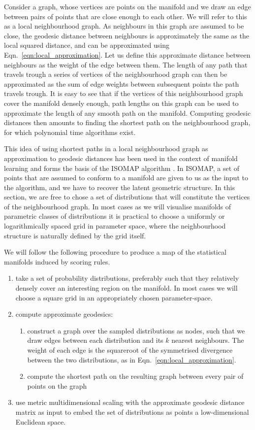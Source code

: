 Consider a graph, whose vertices are points on the manifold and we draw an edge between pairs of points that are close enough to each other. We will refer to this as a local neighbourhood graph. As neighbours in this graph are assumed to be close, the geodesic distance between neighbours is approximately the same as the local squared distance, and can be approximated using Eqn.\ \ref{eqn:local_approximation}. Let us define this approximate distance between neighbours as the weight of the edge between them. The length of any path that travels trough a series of vertices of the neighbourhood graph can then be approximated as the sum of edge weights between subsequent points the path travels trough. It is easy to see that if the vertices of this neighbourhood graph cover the manifold densely enough, path lengths on this graph can be used to approximate the length of any smooth path on the manifold. Computing geodesic distances then amounts to finding the shortest path on the neighbourhood graph, for which polynomial time algorithms exist.

This idea of using shortest paths in a local neighbourhood graph as approximation to geodesic distances has been used in the context of manifold learning and forms the basis of the ISOMAP algorithm \citep{isomap}. In ISOMAP, a set of points that are assumed to conform to a manifold are given to us as the input to the algorithm, and we have to recover the latent geometric structure. In this section, we are free to chose a set of distributions that will constitute the vertices of the neighbourhood graph. In most cases as we will visualise manifolds of parametric classes of distributions it is practical to choose a uniformly or logarithmically spaced grid in parameter space, where the neighbourhood structure is naturally defined by the grid itself.

We will follow the following procedure to produce a map of the statistical manifolds induced by scoring rules.

\begin{enumerate}
\item take a set of probability distributions, preferably such that they relatively densely cover an interesting region on the manifold. In most cases we will choose a square grid in an appropriately chosen parameter-space.
\item compute approximate geodesics:
\begin{enumerate}
	\item construct a graph over the sampled distributions as nodes, such that we draw edges between each distribution and its $k$ nearest neighbours. The weight of each edge is the squareroot of the symmetrised divergence between the two distributions, as in Eqn.\ \eqref{eqn:local_approximation}.
	\item compute the shortest path on the resulting graph between every pair of points on the graph
\end{enumerate}
\item use metric multidimensional scaling with the approximate geodesic distance matrix as input to embed the set of distributions as points a low-dimensional Euclidean space.
\end{enumerate}

